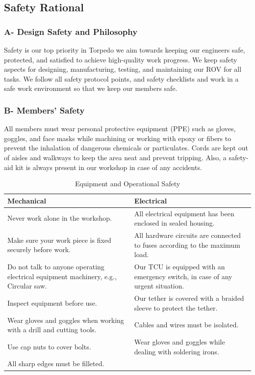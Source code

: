 \documentclass[a4paper,12pt,leqno]{report}
\begin{document}
\textcolor{blue!90}{
\section{Safety Rational}}
\textcolor{blue!40}{
\subsubsection{A- Design Safety and Philosophy}}
Safety is our top priority in Torpedo we aim towards keeping our engineers safe, protected, and satisfied to achieve high-quality work progress. We keep safety aspects for designing, manufacturing, testing, and maintaining our ROV for all tasks. We follow all safety protocol points, and safety checklists and work in a safe work environment so  that we keep our members safe. 

\textcolor{blue!40}{
	\subsubsection{B- Members’ Safety}}
All members must wear personal protective equipment (PPE) such as gloves, goggles, and face  masks while machining or working with epoxy or fibers to prevent the inhalation of dangerous  chemicals or particulates. Cords are kept out of aisles and walkways to keep the area neat and  prevent tripping. Also, a safety-aid kit is always present in our workshop in case of any accidents.  
\begin{table}[H]
\centering
\caption{Equipment and Operational Safety}
\begin{tabular}{|p{8cm}|p{8cm}|}
\hline
\textcolor{red!80}{Mechanical}&\textcolor{red!80}{Electrical}\\ \hline
Never work alone in the workshop. & All electrical equipment has been  enclosed in sealed housing. \\ \hline
Make sure your work piece is fixed  securely before work.  & All hardware circuits are connected  to fuses according to the maximum  load. \\ \hline
Do not talk to anyone operating  electrical equipment machinery,  e.g., Circular saw. &
Our TCU is equipped with an  emergency switch, in case of any  urgent situation.  \\ \hline
Inspect equipment before use. & Our tether is covered with a braided  sleeve to protect the tether. \\ \hline
Wear gloves and goggles when  working with a drill and cutting tools. &  Cables and wires must be isolated.\\ \hline
Use cap nuts to cover bolts. & Wear gloves and goggles while  dealing with soldering irons. \\ \hline
All sharp edges must be filleted. & \\ \hline
\end{tabular}
\end{table}
\end{document}
